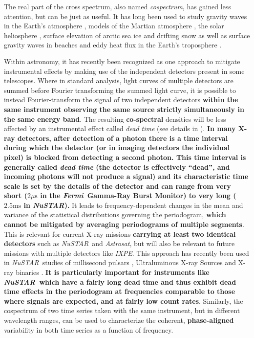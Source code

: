 \documentclass[12pt]{emulateapj}
\newcommand{\project}[1]{\textsl{#1}}
\newcommand{\nustar}{\project{NuSTAR}\xspace}
\newcommand{\fermi}{\project{Fermi}\xspace}
\newcommand{\astrosat}{\project{Astrosat}\xspace}
\newcommand{\ixpe}{\project{IXPE}\xspace}
\begin{document}
The real part of the cross spectrum, also named \textit{cospectrum}, has gained less attention, but can be just as useful. It has long been used to study gravity waves in the Earth's atmosphere \citep[e.g.][]{john2016}, models of the Martian atmosphere \citep[e.g.][]{wang2016}, the solar heliosphere \citep[e.g.][]{vigeesh2017}, surface elevation of arctic sea ice \citep[e.g.][]{ardhuin2016} and drifting snow \citep[e.g.][]{paterna2016} as well as surface gravity waves in beaches \citep[e.g.][]{fiedler2015} and eddy heat flux in the Earth's troposphere \citep[e.g.][]{wang2015,zurita-gotor2017}.

Within astronomy, it has recently been recognized as one approach to mitigate instrumental effects by making use of the independent detectors present in some telescopes. Where in standard analysis, light curves of multiple detectors are summed before Fourier transforming the summed light curve, it is possible to instead Fourier-transform the signal of two independent detectors \textbf{within the same instrument observing the same source strictly simultaneously in the same energy band}. 
The resulting \textbf{co-spectral} densities will be less affected by an instrumental effect called \textit{dead time} (see details in \citealt{Bachetti+15}). \textbf{In many X-ray detectors, after detection of a photon there is a time interval during which the detector (or in imaging detectors the individual pixel) is blocked from detecting a second photon. This time interval is generally called \textit{dead time} (the detector is effectively ``dead'', and incoming photons will not produce a signal) and its characteristic time scale is set by the details of the detector and can range from very short ($2\mu\mathrm{s}$ in the \fermi\ Gamma-Ray Burst Monitor) to very long ($2.5\mathrm{ms}$ in \nustar).} It leads to frequency-dependent changes in the mean and variance of the statistical distributions governing the periodogram, \textbf{which cannot be mitigated by averaging periodograms of multiple segments}. This is relevant for current X-ray missions \textbf{carrying at least two identical detectors} such as \nustar\ and \astrosat, but will also be relevant to future missions with multiple detectors like \ixpe. This approach has recently been used in \nustar\ studies of millisecond pulsars \citep{ferrigno2017}, Ultraluminous X-ray Sources \citep{bachetti2016} and X-ray binaries \citep{barriere2015,zoghbi2016,ingram2016,huppenkothen2017,stiele2017}. \textbf{It is particularly important for instruments like \nustar\ which have a fairly long dead time and thus exhibit dead time effects in the periodogram at frequencies comparable to those where signals are expected, and at fairly low count rates}.  
Similarly, the cospectrum of two time series taken with the same instrument, but in different wavelength ranges, can be used to characterize the coherent, \textbf{phase-aligned} variability in both time series as a function of frequency.
\end{document}

